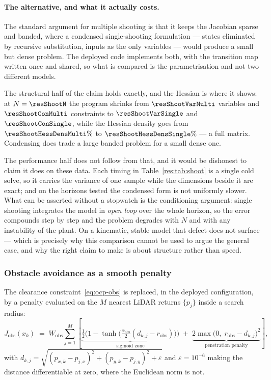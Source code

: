 \documentclass[11pt,a4paper]{article}
\newcommand{\Jobs}{J_{\mathrm{obs}}}
\newcommand{\Wobs}{W_{\mathrm{obs}}}
\newcommand{\aobs}{\alpha_{\mathrm{obs}}}
\newcommand{\robs}{r_{\mathrm{obs}}}
\begin{document}
\paragraph{The alternative, and what it actually costs.} The standard argument for multiple shooting is that
it keeps the Jacobian sparse and banded, where a condensed single-shooting formulation --- states eliminated
by recursive substitution, inputs as the only variables --- would produce a small but dense problem. The
deployed code implements both, with the transition map written once and shared, so what is compared is the
parametrisation and not two different models.


The structural half of the claim holds exactly, and the Hessian is where it shows: at $N=\resShootN$ the
program shrinks from $\resShootVarMulti$ variables and $\resShootConMulti$ constraints to
$\resShootVarSingle$ and $\resShootConSingle$, while the Hessian density goes from
$\resShootHessDensMulti\%$ to $\resShootHessDensSingle\%$ --- a full matrix. Condensing does trade a large
banded problem for a small dense one.

The performance half does not follow from that, and it would be dishonest to claim it does on these data.
Each timing in Table~\ref{res:tab:shoot} is a single cold solve, so it carries the variance of one sample
while the dimensions beside it are exact; and on the horizons tested the condensed form is not uniformly
slower. What can be asserted without a stopwatch is the conditioning argument: single shooting integrates the
model in \emph{open loop} over the whole horizon, so the error compounds step by step and the problem
degrades with $N$ and with any instability of the plant. On a kinematic, stable model that defect does not
surface --- which is precisely why this comparison cannot be used to argue the general case, and why the
right claim to make is about structure rather than speed.

\subsubsection{Obstacle avoidance as a smooth penalty}
\label{sec:barrier}

The clearance constraint~\eqref{eq:ocp-obs} is replaced, in the deployed configuration, by a penalty
evaluated on the $M$ nearest LiDAR returns $\{p_j\}$ inside a search radius:
\begin{equation}
  \Jobs(x_k) \;=\; \Wobs\sum_{j=1}^{M}
  \left[\underbrace{\tfrac12\Big(1-\tanh\big(\tfrac{\aobs}{2}(d_{k,j}-\robs)\big)\Big)}_{\text{sigmoid zone}}
  \;+\;\underbrace{2\max\!\big(0,\;\robs-d_{k,j}\big)^2}_{\text{penetration penalty}}\right],
  \label{eq:barrier}
\end{equation}
with $d_{k,j}=\sqrt{(p_{x,k}-p_{j,x})^2+(p_{y,k}-p_{j,y})^2+\varepsilon}$ and $\varepsilon=10^{-6}$ making
the distance differentiable at zero, where the Euclidean norm is not.
\end{document}
